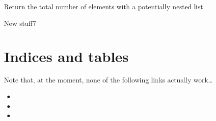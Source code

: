 \documentclass[letterpaper,10pt,english]{sphinxmanual}
\begin{document}
\begin{fulllineitems}
\label{\detokenize{_autosummary/tools.python.recursive_len:tools.python.recursive_len}}
\sphinxAtStartPar
Return the total number of elements with a potentially nested list

\end{fulllineitems}


\sphinxAtStartPar
New stuff7


\chapter{Indices and tables}
\label{\detokenize{index:indices-and-tables}}
\sphinxAtStartPar
Note that, at the moment, none of the following links actually work…
\begin{itemize}
\item {} 
\sphinxAtStartPar
{}

\item {} 
\sphinxAtStartPar
{}

\item {} 
\sphinxAtStartPar
{}

\end{itemize}
\end{document}
